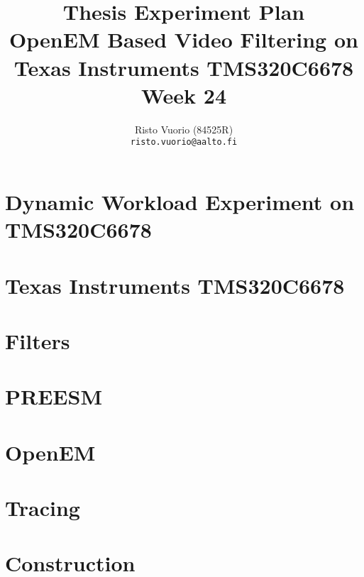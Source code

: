 \documentclass[a4paper,10pt]{article}
\title{Thesis Experiment Plan \\
		OpenEM Based Video Filtering on Texas Instruments TMS320C6678 \\
		Week 24}
\author{Risto Vuorio (84525R) \\
		{\tt risto.vuorio@aalto.fi}}
\begin{document}
\maketitle
\newpage
\tableofcontents
\newpage

\section{Dynamic Workload Experiment on TMS320C6678}


\section{Texas Instruments TMS320C6678}


\section{Filters}


\section{PREESM}


\section{OpenEM}


\section{Tracing}


\section{Construction}


%   

%   
\end{document}
